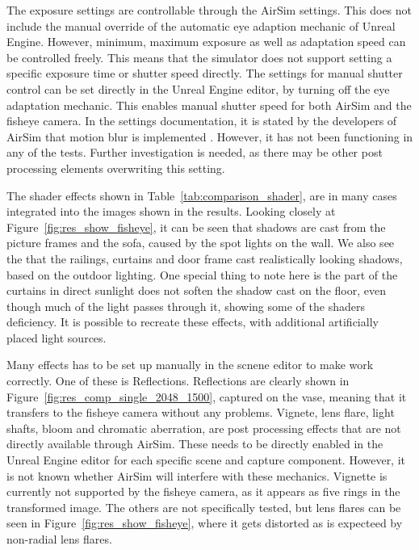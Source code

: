 The exposure settings are controllable through the AirSim settings. This does not include the manual override of the automatic eye adaption mechanic of Unreal Engine. However, minimum, maximum exposure as well as adaptation speed can be controlled freely. This means that the simulator does not support setting a specific exposure time or shutter speed directly. The settings for manual shutter control can be set directly in the Unreal Engine editor, by turning off the eye adaptation mechanic. This enables manual shutter speed for both AirSim and the fisheye camera. In the settings documentation, it is stated by the developers of AirSim that motion blur is implemented \cite{AirSimSettings}. However, it has not been functioning in any of the tests. Further investigation is needed, as there may be other post processing elements overwriting this setting.

The shader effects shown in Table~\ref{tab:comparison_shader}, are in many cases integrated into the images shown in the results. Looking closely at Figure~\ref{fig:res_show_fisheye}, it can be seen that shadows are cast from the picture frames and the sofa, caused by the spot lights on the wall. We also see the that the railings, curtains and door frame cast realistically looking shadows, based on the outdoor lighting. One special thing to note here is the part of the curtains in direct sunlight does not soften the shadow cast on the floor, even though much of the light passes through it, showing some of the shaders deficiency. It is possible to recreate these effects, with additional artificially placed light sources.

Many effects has to be set up manually in the scnene editor to make work correctly. One of these is Reflections. Reflections are clearly shown in Figure~\ref{fig:res_comp_single_2048_1500}, captured on the vase, meaning that it transfers to the fisheye camera without any problems. Vignete, lens flare, light shafts, bloom and chromatic aberration, are post processing effects that are not directly available through AirSim. These needs to be directly enabled in the Unreal Engine editor for each specific scene and capture component. However, it is not known whether AirSim will interfere with these mechanics. Vignette is currently not supported by the fisheye camera, as it appears as five rings in the transformed image. The others are not specifically tested, but lens flares can be seen in Figure~\ref{fig:res_show_fisheye}, where it gets distorted as is expecteed by non-radial lens flares.

